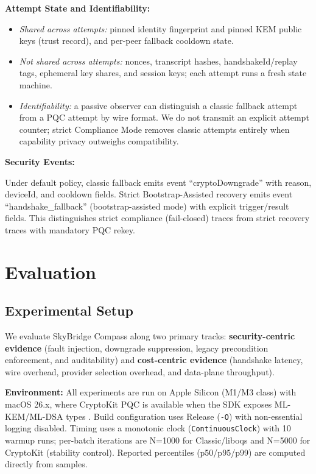 \documentclass[10pt,journal,compsoc]{IEEEtran}
\providecommand{\tightlist}{%
  \setlength{\itemsep}{0pt}\setlength{\parskip}{0pt}}
\begin{document}
\textbf{Attempt State and Identifiability:}
\begin{itemize}\tightlist
\item \emph{Shared across attempts:} pinned identity fingerprint and pinned KEM public keys (trust record), and per-peer fallback cooldown state.
\item \emph{Not shared across attempts:} nonces, transcript hashes, handshakeId/replay tags, ephemeral key shares, and session keys; each attempt runs a fresh state machine.
\item \emph{Identifiability:} a passive observer can distinguish a classic fallback attempt from a PQC attempt by wire format. We do not transmit an explicit attempt counter; strict Compliance Mode removes classic attempts entirely when capability privacy outweighs compatibility.
\end{itemize}

\textbf{Security Events:}

Under default policy, classic fallback emits event
``cryptoDowngrade'' with reason, deviceId, and cooldown fields.
Strict Bootstrap-Assisted recovery emits event
``handshake\_fallback'' (bootstrap-assisted mode) with explicit
trigger/result fields. This distinguishes strict compliance
(fail-closed) traces from strict recovery traces with mandatory
PQC rekey.



\section{Evaluation}\label{sec:evaluation}

\subsection{Experimental Setup}\label{a.-experimental-setup}

We evaluate SkyBridge Compass along two primary tracks:
\textbf{security-centric evidence} (fault injection, downgrade
suppression, legacy precondition enforcement, and auditability) and
\textbf{cost-centric evidence} (handshake latency, wire overhead,
provider selection overhead, and data-plane throughput).

\textbf{Environment:} All experiments are run on Apple Silicon (M1/M3 class) with macOS 26.x, where CryptoKit PQC is available when the SDK exposes ML-KEM/ML-DSA types \cite{ref1,ref34}. Build configuration uses Release (\texttt{-O}) with non-essential logging disabled. Timing uses a monotonic clock (\texttt{ContinuousClock}) with 10 warmup runs; per-batch iterations are N=1000 for Classic/liboqs and N=5000 for CryptoKit (stability control). Reported percentiles (p50/p95/p99) are computed directly from samples.
\end{document}
